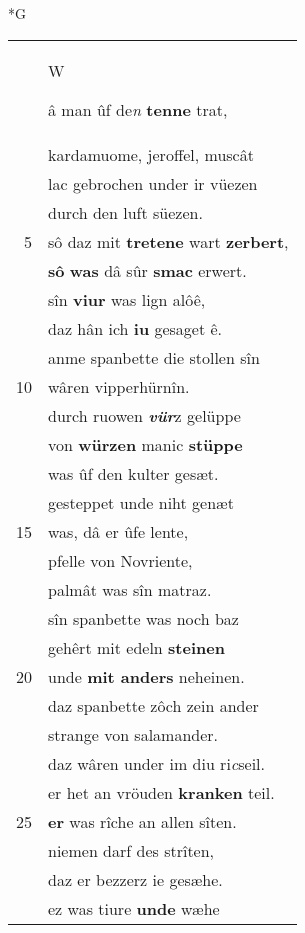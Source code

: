 \documentclass[8pt,a4paper,notitlepage]{article}
\begin{document}
\newpage
\begin{table}[ht]
\begin{minipage}[t]{0.5\linewidth}
\small
\begin{center}*G
\end{center}
\begin{tabular}{rl}
 & \begin{large}W\end{large}â man ûf de\textit{n} \textbf{tenne} trat,\\ 
 & kardamuome, jeroffel, muscât\\ 
 & lac gebrochen under ir vüezen\\ 
 & durch den luft süezen.\\ 
5 & sô daz mit \textbf{tretene} wart \textbf{zerbert},\\ 
 & \textbf{sô} \textbf{was} dâ sûr \textbf{smac} erwert.\\ 
 & sîn \textbf{viur} was lign alôê,\\ 
 & daz hân ich \textbf{iu} gesaget ê.\\ 
 & anme spanbette die stollen sîn\\ 
10 & wâren vipperhürnîn.\\ 
 & durch ruowen \textit{\textbf{vür}}z gelüppe\\ 
 & von \textbf{würzen} manic \textbf{stüppe}\\ 
 & was ûf den kulter gesæt.\\ 
 & gesteppet unde niht genæt\\ 
15 & was, dâ er ûfe lente,\\ 
 & pfelle von Novriente,\\ 
 & palmât was sîn matraz.\\ 
 & sîn spanbette was noch baz\\ 
 & gehêrt mit edeln \textbf{steinen}\\ 
20 & unde \textbf{mit anders} neheinen.\\ 
 & daz spanbette zôch zein ander\\ 
 & strange von salamander.\\ 
 & daz wâren under im diu ri\textit{c}seil.\\ 
 & er het an vröuden \textbf{kranken} teil.\\ 
25 & \textbf{er} was rîche an allen sîten.\\ 
 & niemen darf des strîten,\\ 
 & daz er bezzerz ie gesæhe.\\ 
 & ez was tiure \textbf{unde} wæhe\\ 

\end{tabular}
\end{minipage}
\end{table}
\end{document}
